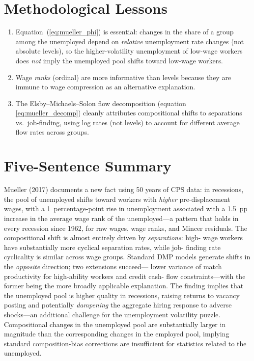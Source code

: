 \section{Methodological Lessons}

\begin{enumerate}
  \item Equation~(\ref{eq:mueller_phi}) is essential: changes in the share of
    a group among the unemployed depend on \emph{relative} unemployment rate
    changes (not absolute levels), so the higher-volatility unemployment of
    low-wage workers does \emph{not} imply the unemployed pool shifts toward
    low-wage workers.
  \item Wage \emph{ranks} (ordinal) are more informative than levels because
    they are immune to wage compression as an alternative explanation.
  \item The Elsby--Michaels--Solon flow decomposition (equation
    \ref{eq:mueller_decomp}) cleanly attributes compositional shifts to
    separations vs.\ job-finding, using log rates (not levels) to account
    for different average flow rates across groups.
\end{enumerate}

\section*{Five-Sentence Summary}

Mueller (2017) documents a new fact using 50 years of CPS data: in recessions,
the pool of unemployed shifts toward workers with \emph{higher} pre-displacement
wages, with a 1~percentage-point rise in unemployment associated with a 1.5~pp
increase in the average wage rank of the unemployed---a pattern that holds in
every recession since 1962, for raw wages, wage ranks, and Mincer residuals.
The compositional shift is almost entirely driven by \emph{separations}: high-
wage workers have substantially more cyclical separation rates, while job-
finding rate cyclicality is similar across wage groups. Standard DMP models
generate shifts in the \emph{opposite} direction; two extensions succeed---
lower variance of match productivity for high-ability workers and credit cash-
flow constraints---with the former being the more broadly applicable
explanation. The finding implies that the unemployed pool is higher quality in
recessions, raising returns to vacancy posting and potentially \emph{dampening}
the aggregate hiring response to adverse shocks---an additional challenge for
the unemployment volatility puzzle. Compositional changes in the unemployed
pool are substantially larger in magnitude than the corresponding changes in
the employed pool, implying standard composition-bias corrections are
insufficient for statistics related to the unemployed.


